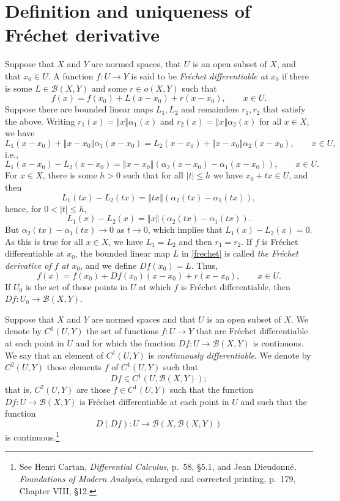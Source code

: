 \documentclass{article}
\newcommand{\norm}[1]{\left\Vert #1 \right\Vert}
\theoremstyle{definition}
\theoremstyle{definition}
\begin{document}
\section{Definition and uniqueness of Fr\'echet derivative}
Suppose that $X$ and $Y$ are normed spaces, that  $U$ is an open subset of $X$, and  that $x_0 \in U$. A function  $f:U \to Y$
 is said to be {\em Fr\'echet differentiable at $x_0$} if there is some $L \in \mathscr{B}(X,Y)$
and some $r \in o(X,Y)$ such that
\begin{equation}
f(x) = f(x_0) + L(x-x_0)+r(x-x_0), \qquad x \in U.
\label{frechet}
\end{equation}
Suppose there are bounded linear maps $L_1,L_2$ and remainders $r_1,r_2$ that satisfy the above. 
Writing $r_1(x)=\norm{x}\alpha_1(x)$ and $r_2(x)=\norm{x}\alpha_2(x)$ for all $x \in X$, we have
\[
L_1(x-x_0)+\norm{x-x_0}\alpha_1(x-x_0)=L_2(x-x_0)+\norm{x-x_0}\alpha_2(x-x_0), \qquad x \in U,
\]
i.e.,
\[
L_1(x-x_0)-L_2(x-x_0) = \norm{x-x_0}(\alpha_2(x-x_0)-\alpha_1(x-x_0)), \qquad x \in U.
\]
For $x \in X$, there is some $h>0$ such that for all $|t| \leq h$ we have  $x_0+tx \in U$, and then
\[
L_1(tx)-L_2(tx) = \norm{tx}(\alpha_2(tx)-\alpha_1(tx)),
\]
hence, for $0<|t| \leq h$,
\[
L_1(x)-L_2(x) = \norm{x}(\alpha_2(tx)-\alpha_1(tx)).
\]
But $\alpha_2(tx)-\alpha_1(tx) \to 0$ as $t \to 0$, which implies that $L_1(x)-L_2(x)=0$. As this is true for all $x \in X$,
we have $L_1=L_2$ and then $r_1=r_2$. 
If $f$ is Fr\'echet differentiable at $x_0$, 
the bounded linear map $L$ in \eqref{frechet} is called {\em the  Fr\'echet derivative of $f$ at $x_0$}, and we define
$Df(x_0)=L$. Thus, 
\[
f(x)=f(x_0)+Df(x_0)(x-x_0)+r(x-x_0), \qquad x \in U.
\]
If $U_0$ is the set of those points in $U$ at which $f$ is Fr\'echet differentiable, then
$Df:U_0 \to \mathscr{B}(X,Y)$.


Suppose that $X$ and $Y$ are normed spaces and that $U$ is an open subset of $X$.
We denote by $C^1(U,Y)$ the set of functions $f:U \to Y$ that are Fr\'echet differentiable at each point in $U$ and for
which the function $Df:U \to \mathscr{B}(X,Y)$ is continuous. We say that an element of $C^1(U,Y)$ is {\em continuously
differentiable}. We denote by $C^2(U,Y)$ those elements $f$ of $C^1(U,Y)$ such that
\[
Df \in C^1(U,\mathscr{B}(X,Y));
\]
that is, $C^2(U,Y)$ are those $f \in C^1(U,Y)$ such that the function $Df:U \to \mathscr{B}(X,Y)$ is Fr\'echet differentiable at each point in $U$ and such that 
the function
\[
D(Df):U \to \mathscr{B}(X,\mathscr{B}(X,Y))
\]
is continuous.\footnote{See Henri Cartan, {\em Differential Calculus}, p.~58, \S 5.1, and Jean Dieudonn\'e, {\em Foundations of Modern Analysis},
enlarged and corrected printing, p.~179, Chapter VIII, \S 12.}
\end{document}
